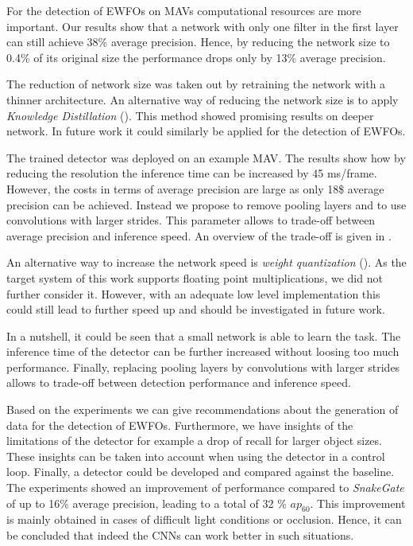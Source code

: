 \begin{enumerate}
	For the detection of \acp{EWFO} on \acp{MAV} computational resources are more important. Our results show that a network with only one filter in the first layer can still achieve 38\% average precision. Hence, by reducing the network size to 0.4\% of its original size the performance drops only by 13\% average precision.
	
	The reduction of network size was taken out by retraining the network with a thinner architecture. An alternative way of reducing the network size is to apply \textit{Knowledge Distillation} (). This method showed promising results on deeper network. In future work it could similarly be applied for the detection of \acp{EWFO}.
	
	The trained detector was deployed on an example \ac{MAV}. The results show how by reducing the resolution the inference time can be increased by 45 ms/frame. However, the costs in terms of average precision are large as only 18\$ average precision can be achieved. Instead we propose to remove pooling layers and to use convolutions with larger strides. This parameter allows to trade-off between average precision and inference speed. An overview of the trade-off is given in .
	
	An alternative way to increase the network speed is \textit{weight quantization} (). As the target system of this work supports floating point multiplications, we did not further consider it. However, with an adequate low level implementation this could still lead to further speed up and should be investigated in future work.
	
	In a nutshell, it could be seen that a small network is able to learn the task. The inference time of the detector can be further increased without loosing too much performance. Finally, replacing pooling layers by convolutions with larger strides allows to trade-off between detection performance and inference speed.
		
\end{enumerate}

Based on the experiments we can give recommendations about the generation of data for the detection of \acp{EWFO}. Furthermore, we have insights of the limitations of the detector for example a drop of recall for larger object sizes. These insights can be taken into account when using the detector in a control loop. Finally, a detector could be developed and compared against the baseline. The experiments showed an improvement of performance compared to \textit{SnakeGate} of up to 16\% average precision, leading to a total of 32 \% $ap_{60}$. This improvement is mainly obtained in cases of difficult light conditions or occlusion. Hence, it can be concluded that indeed the \acp{CNN} can work better in such situations.

